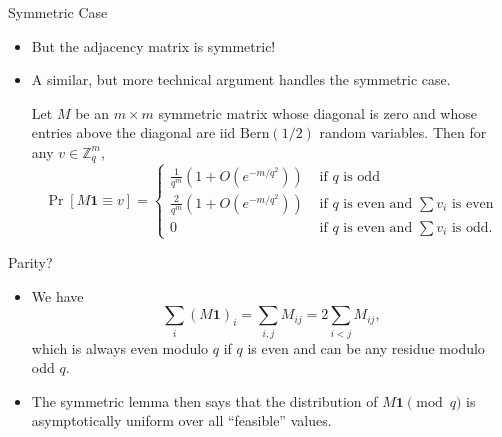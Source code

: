 \documentclass{beamer}
\theoremstyle{plain}
\newcommand{\Bern}{\text{Bern}}
\newcommand{\Z}{\mathbb{Z}}
\begin{document}
	\begin{frame}{Symmetric Case}
		\begin{itemize}
			\item But the adjacency matrix is symmetric!

			\pause

			\item A similar, but more technical argument handles the symmetric case.

			\pause

			\begin{lemma}
				Let $M$ be an $m\times m$ symmetric matrix whose diagonal is zero and whose entries above the diagonal are iid $\Bern(1/2)$ random variables.
				Then for any $v\in \Z_q^m$,
				\[
					\Pr[M\boldsymbol{1} \equiv v] = \begin{cases}
						\frac{1}{q^m}(1 + O(e^{-m/q^2})) & \text{ if $q$ is odd}\\
						\frac{2}{q^m}(1 + O(e^{-m/q^2})) & \text{ if $q$ is even and $\sum v_i$ is even}\\
						0 & \text{ if $q$ is even and $\sum v_i$ is odd}.
					\end{cases}
				\]
			\end{lemma}
		\end{itemize}
	\end{frame}


	\begin{frame}{Parity?}
		\begin{itemize}
			\item We have
			\[
				\sum_i (M\boldsymbol{1})_i = \sum_{i,j} M_{ij} = 2\sum_{i<j}M_{ij},
			\]
			which is always even modulo $q$ if $q$ is even and can be any residue modulo odd $q$.

			\pause

			\item The symmetric lemma then says that the distribution of $M\boldsymbol{1}\pmod q$ is asymptotically uniform over all ``feasible'' values.
		\end{itemize}
	\end{frame}
\end{document}
